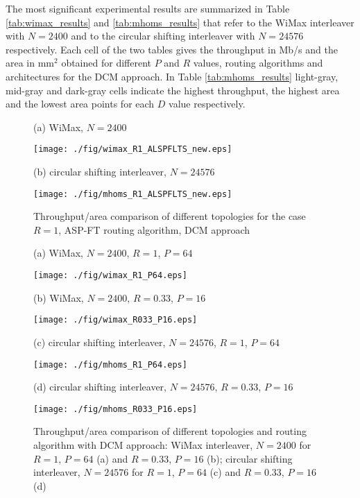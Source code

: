 \documentclass[10pt,twocolumn,journal]{IEEEtran}
\begin{document}
The most significant experimental results are summarized in Table \ref{tab:wimax_results} and \ref{tab:mhoms_results} that
refer to the WiMax interleaver with $N=2400$ and to the circular shifting interleaver with $N=24576$ respectively. 
Each cell of the two tables gives the throughput in Mb/s and the area in mm$^2$ obtained for different 
$P$ and $R$ values, routing algorithms and architectures for the DCM approach. In Table \ref{tab:mhoms_results} light-gray, mid-gray and dark-gray cells indicate 
the highest throughput, the highest area and the lowest area points for each $D$ value respectively.
\begin{figure*}
  \begin{minipage}[b]{.50\linewidth}
    \centering
    \centerline{\scriptsize{(a) WiMax, $N=2400$}} 
   \centerline{
      \texttt{[image: ./fig/wimax\_R1\_ALSPFLTS\_new.eps]}
    } \medskip
    \end{minipage}
  \hfill
  \begin{minipage}[b]{.50\linewidth}
    \centering
    \centerline{\scriptsize{(b) circular shifting interleaver, $N=24576$}} 
    \centerline{
      \texttt{[image: ./fig/mhoms\_R1\_ALSPFLTS\_new.eps]}
    } \medskip
  \end{minipage}
\caption{Throughput/area comparison of different topologies for the case $R=1$, ASP-FT routing algorithm, DCM 
approach} \label{fig:R1_ASP-FT}
\end{figure*}
\begin{figure*}
\begin{minipage}[b]{.50\linewidth}
    \centering
    \centerline{\scriptsize{(a) WiMax, $N=2400$, $R=1$, $P=64$}} 
   \centerline{
      \texttt{[image: ./fig/wimax\_R1\_P64.eps]}
    } \medskip
    \end{minipage}
  \hfill
  \begin{minipage}[b]{.50\linewidth}
    \centering
    \centerline{\scriptsize{(b) WiMax, $N=2400$, $R=0.33$, $P=16$}} 
    \centerline{
      \texttt{[image: ./fig/wimax\_R033\_P16.eps]}
    } \medskip
  \end{minipage}
\begin{minipage}[b]{.50\linewidth}
    \centering
    \centerline{\scriptsize{(c) circular shifting interleaver, $N=24576$, $R=1$, $P=64$}} 
   \centerline{
      \texttt{[image: ./fig/mhoms\_R1\_P64.eps]}
    } \medskip
    \end{minipage}
  \hfill
  \begin{minipage}[b]{.50\linewidth}
    \centering
    \centerline{\scriptsize{(d) circular shifting interleaver, $N=24576$, $R=0.33$, $P=16$}} 
    \centerline{
      \texttt{[image: ./fig/mhoms\_R033\_P16.eps]}
    } \medskip
  \end{minipage}
\caption{Throughput/area comparison of different topologies and routing algorithm with DCM approach: 
WiMax interleaver, $N=2400$ for $R=1$, $P=64$ (a) and $R=0.33$, $P=16$ (b); circular shifting interleaver, 
$N=24576$ for $R=1$, $P=64$ (c) and $R=0.33$, $P=16$ (d)}
\label{fig:tar_tot}
\end{figure*}
\end{document}
